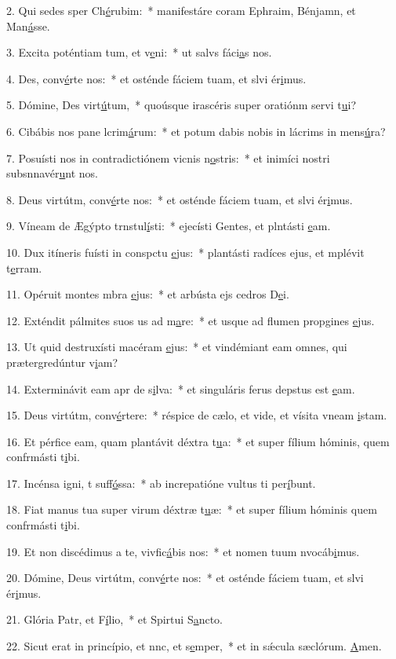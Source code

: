 2. Qui sedes sper Ch\uline{é}rubim:~* manifestáre coram Ephraim, Bénjamn, et Man\uline{á}sse.\par 
3. Excita poténtiam tum, et v\uline{e}ni:~* ut salvs fáci\uline{a}s nos.\par 
4. Des, conv\uline{é}rte nos:~* et osténde fáciem tuam, et slvi ér\uline{i}mus.\par 
5. Dómine, Des virt\uline{ú}tum,~* quoúsque irascéris super oratiónm servi t\uline{u}i?\par 
6. Cibábis nos pane lcrim\uline{á}rum:~* et potum dabis nobis in lácrims in mens\uline{ú}ra?\par 
7. Posuísti nos in contradictiónem vicnis n\uline{o}stris:~* et inimíci nostri subsnnavér\uline{u}nt nos.\par 
8. Deus virtútm, conv\uline{é}rte nos:~* et osténde fáciem tuam, et slvi ér\uline{i}mus.\par 
9. Víneam de Ægýpto trnstul\uline{í}sti:~* ejecísti Gentes, et plntásti \uline{e}am.\par 
10. Dux itíneris fuísti in conspctu \uline{e}jus:~* plantásti radíces ejus, et mplévit t\uline{e}rram.\par 
11. Opéruit montes mbra \uline{e}jus:~* et arbústa ejs cedros D\uline{e}i.\par 
12. Exténdit pálmites suos us ad m\uline{a}re:~* et usque ad flumen propgines \uline{e}jus.\par 
13. Ut quid destruxísti macéram \uline{e}jus:~* et vindémiant eam omnes, qui prætergredúntur v\uline{i}am?\par 
14. Exterminávit eam apr de s\uline{i}lva:~* et singuláris ferus depstus est \uline{e}am.\par 
15. Deus virtútm, conv\uline{é}rtere:~* réspice de cælo, et vide, et vísita vneam \uline{i}stam.\par 
16. Et pérfice eam, quam plantávit déxtra t\uline{u}a:~* et super fílium hóminis, quem confrmásti t\uline{i}bi.\par 
17. Incénsa igni, t suff\uline{ó}ssa:~* ab increpatióne vultus ti per\uline{í}bunt.\par 
18. Fiat manus tua super virum déxtræ t\uline{u}æ:~* et super fílium hóminis quem confrmásti t\uline{i}bi.\par 
19. Et non discédimus a te, vivfic\uline{á}bis nos:~* et nomen tuum nvocáb\uline{i}mus.\par 
20. Dómine, Deus virtútm, conv\uline{é}rte nos:~* et osténde fáciem tuam, et slvi ér\uline{i}mus.\par 
21. Glória Patr, et F\uline{í}lio,~* et Spirtui S\uline{a}ncto.\par 
22. Sicut erat in princípio, et nnc, et s\uline{e}mper,~* et in sǽcula sæclórum. \uline{A}men.\par 
